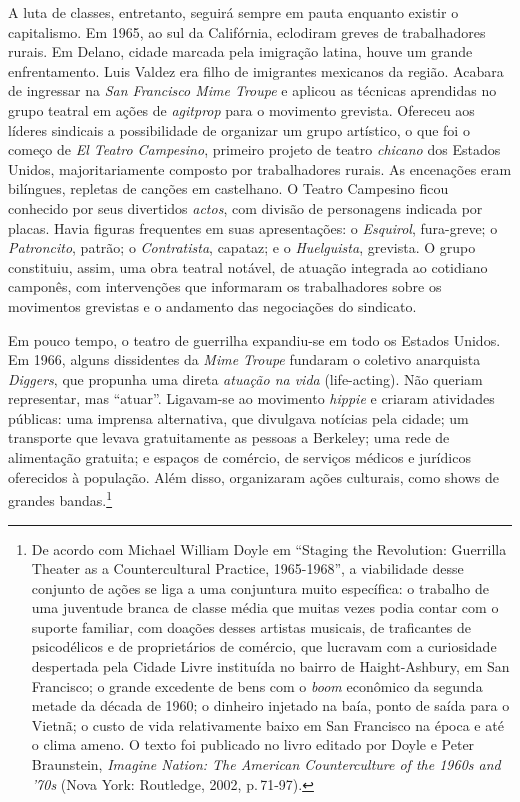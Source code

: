 
A luta de classes, entretanto, seguirá sempre em pauta enquanto existir
o capitalismo. Em 1965, ao sul da Califórnia, eclodiram greves de
trabalhadores rurais. Em Delano, cidade marcada pela imigração latina,
houve um grande enfrentamento. Luis Valdez era filho de imigrantes
mexicanos da região. Acabara de ingressar na {\it San Francisco Mime
Troupe} e aplicou as técnicas aprendidas no grupo teatral em ações de
{\it agitprop} para o movimento grevista. Ofereceu aos líderes sindicais
a possibilidade de organizar um grupo artístico, o que foi o começo de
{\it El Teatro Campesino}, primeiro projeto de teatro {\it chicano} dos
Estados Unidos, majoritariamente composto por trabalhadores rurais. As
encenações eram bilíngues, repletas de canções em castelhano. O Teatro
Campesino ficou conhecido por seus divertidos {\it actos}, com divisão
de personagens indicada por placas. Havia figuras frequentes em suas
apresentações: o {\it Esquirol}, fura-greve; o {\it Patroncito}, patrão; o
{\it Contratista}, capataz; e o {\it Huelguista}, grevista. O grupo
constituiu, assim, uma obra teatral notável, de atuação integrada ao
cotidiano camponês, com intervenções que informaram os trabalhadores
sobre os movimentos grevistas e o andamento das negociações do
sindicato.

Em pouco tempo, o teatro de guerrilha expandiu-se em todo os
Estados Unidos. Em 1966, alguns dissidentes da {\it Mime Troupe} fundaram o
coletivo anarquista {\it Diggers}, que propunha uma direta {\it atuação
na vida} (life-acting). Não queriam representar, mas “atuar”.
Ligavam-se ao movimento {\it hippie} e criaram atividades públicas: uma
imprensa alternativa, que divulgava notícias pela cidade; um transporte
que levava gratuitamente as pessoas a Berkeley; uma rede de alimentação
gratuita; e espaços de comércio, de serviços médicos e jurídicos
oferecidos à população. Além disso, organizaram ações culturais, como
shows de grandes bandas.\footnote{De acordo com Michael William Doyle em
  “Staging the Revolution: Guerrilla Theater as a Countercultural
  Practice, 1965-1968”, a viabilidade desse conjunto de ações se liga a
  uma conjuntura muito específica: o trabalho de uma juventude branca de
  classe média que muitas vezes podia contar com o suporte familiar, com
  doações desses artistas musicais, de traficantes de psicodélicos
  e de proprietários de comércio, que lucravam com a curiosidade
  despertada pela Cidade Livre instituída no bairro de Haight-Ashbury,
  em San Francisco; o grande excedente de bens com o {\it boom}
  econômico da segunda metade da década de 1960; o dinheiro injetado na
  baía, ponto de saída para o Vietnã; o custo de vida relativamente
  baixo em San Francisco na época e até o clima ameno. O texto foi
  publicado no livro editado por Doyle e Peter Braunstein, {\it Imagine
  Nation: The American Counterculture of the 1960s and '70s} (Nova York:
  Routledge, 2002, p.\,71-97).}

